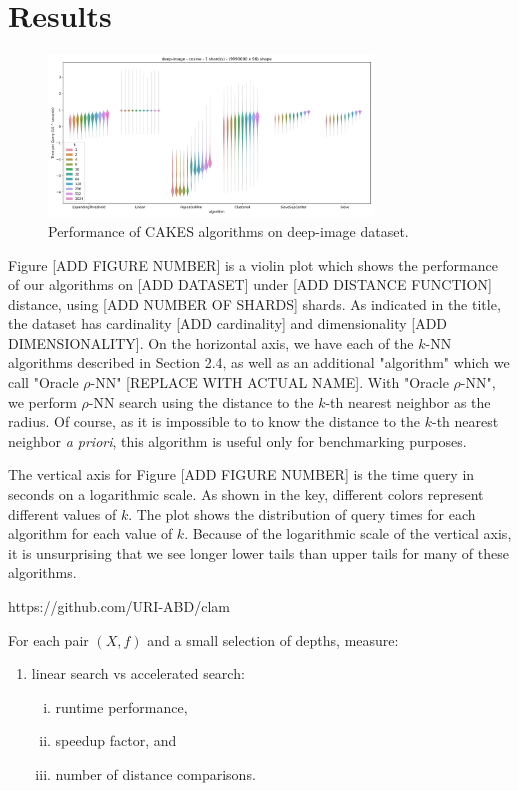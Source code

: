 \section{Results}
\label{sec:results}

\begin{figure}[ht!]
    \centering
    \includegraphics[width=3.4in]{images/result_plots/deep-image_1.png}
    \caption{Performance of CAKES algorithms on deep-image dataset.}
    \label{fig:methods:deep-image}
\end{figure}

Figure [ADD FIGURE NUMBER] is a violin plot which shows the performance of our algorithms
on [ADD DATASET] under [ADD DISTANCE FUNCTION] distance, using [ADD NUMBER OF SHARDS] shards.
As indicated in the title, the dataset has cardinality [ADD cardinality] and dimensionality [ADD DIMENSIONALITY].
On the horizontal axis, we have each of the $k$-NN algorithms described in Section 2.4, as well as  
an additional "algorithm" which we call "Oracle $\rho$-NN" [REPLACE WITH ACTUAL NAME].  With "Oracle $\rho$-NN", we perform $\rho$-NN search using the 
distance to the $k$-th nearest neighbor as the radius. Of course, as it is impossible to
to know the distance to the $k$-th nearest neighbor \emph{a priori}, this algorithm 
is useful only for benchmarking purposes.

The vertical axis for Figure [ADD FIGURE NUMBER] is the time query in seconds on a logarithmic scale. 
As shown in the key, different colors represent different values of $k$. 
The plot shows the distribution of query times for each algorithm for each value of $k$. 
Because of the logarithmic scale of the vertical axis, it is unsurprising that we 
see longer lower tails than upper tails for many of these algorithms. 


https://github.com/URI-ABD/clam

For each pair $(X, f)$ and a small selection of depths, measure:
\begin{enumerate}[1.]
    \item linear search vs accelerated search:
    \begin{enumerate}[i.]
        \item runtime performance,
        \item speedup factor, and
        \item number of distance comparisons.
    \end{enumerate}
\end{enumerate}

